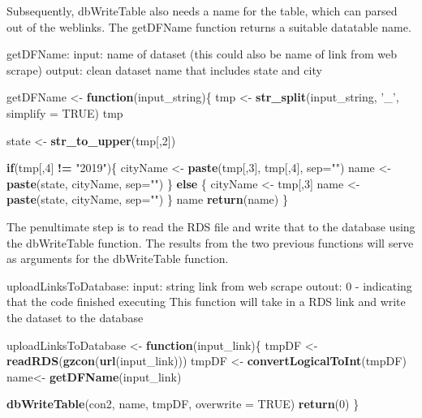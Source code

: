 \documentclass[
]{book}
\newenvironment{Shaded}{\begin{snugshade}}{\end{snugshade}}
\newcommand{\ControlFlowTok}[1]{\textcolor[rgb]{0.13,0.29,0.53}{\textbf{#1}}}
\newcommand{\DataTypeTok}[1]{\textcolor[rgb]{0.13,0.29,0.53}{#1}}
\newcommand{\DecValTok}[1]{\textcolor[rgb]{0.00,0.00,0.81}{#1}}
\newcommand{\KeywordTok}[1]{\textcolor[rgb]{0.13,0.29,0.53}{\textbf{#1}}}
\newcommand{\NormalTok}[1]{#1}
\newcommand{\OperatorTok}[1]{\textcolor[rgb]{0.81,0.36,0.00}{\textbf{#1}}}
\newcommand{\OtherTok}[1]{\textcolor[rgb]{0.56,0.35,0.01}{#1}}
\newcommand{\StringTok}[1]{\textcolor[rgb]{0.31,0.60,0.02}{#1}}
\begin{document}
Subsequently, dbWriteTable also needs a name for the table, which can parsed out of the weblinks. The getDFName function returns a suitable datatable name.

getDFName:
input: name of dataset (this could also be name of link from web scrape)
output: clean dataset name that includes state and city

\begin{Shaded}
\begin{Highlighting}[]
\NormalTok{getDFName <-}\StringTok{ }\ControlFlowTok{function}\NormalTok{(input_string)\{}
\NormalTok{  tmp <-}\StringTok{ }\KeywordTok{str_split}\NormalTok{(input_string, }\StringTok{'_'}\NormalTok{, }\DataTypeTok{simplify =} \OtherTok{TRUE}\NormalTok{)}
\NormalTok{tmp}

\NormalTok{state <-}\StringTok{ }\KeywordTok{str_to_upper}\NormalTok{(tmp[,}\DecValTok{2}\NormalTok{])}

\ControlFlowTok{if}\NormalTok{(tmp[,}\DecValTok{4}\NormalTok{] }\OperatorTok{!=}\StringTok{ "2019"}\NormalTok{)\{}
\NormalTok{    cityName <-}\StringTok{ }\KeywordTok{paste}\NormalTok{(tmp[,}\DecValTok{3}\NormalTok{], tmp[,}\DecValTok{4}\NormalTok{], }\DataTypeTok{sep=}\StringTok{""}\NormalTok{)}
\NormalTok{    name <-}\StringTok{ }\KeywordTok{paste}\NormalTok{(state, cityName, }\DataTypeTok{sep=}\StringTok{""}\NormalTok{)}
\NormalTok{\} }\ControlFlowTok{else}\NormalTok{ \{}
\NormalTok{    cityName <-}\StringTok{ }\NormalTok{tmp[,}\DecValTok{3}\NormalTok{]}
\NormalTok{    name <-}\StringTok{ }\KeywordTok{paste}\NormalTok{(state, cityName, }\DataTypeTok{sep=}\StringTok{""}\NormalTok{)}
\NormalTok{\}}
\NormalTok{name}
\KeywordTok{return}\NormalTok{(name)}
\NormalTok{\}}
\end{Highlighting}
\end{Shaded}

The penultimate step is to read the RDS file and write that to the database using the dbWriteTable function. The results from the two previous functions will serve as arguments for the dbWriteTable function.

uploadLinksToDatabase:
input: string link from web scrape
outout: 0 - indicating that the code finished executing
This function will take in a RDS link and write the dataset to the database

\begin{Shaded}
\begin{Highlighting}[]
\NormalTok{uploadLinksToDatabase <-}\StringTok{ }\ControlFlowTok{function}\NormalTok{(input_link)\{}
\NormalTok{  tmpDF <-}\StringTok{ }\KeywordTok{readRDS}\NormalTok{(}\KeywordTok{gzcon}\NormalTok{(}\KeywordTok{url}\NormalTok{(input_link)))}
\NormalTok{  tmpDF <-}\StringTok{ }\KeywordTok{convertLogicalToInt}\NormalTok{(tmpDF)}
\NormalTok{  name<-}\StringTok{ }\KeywordTok{getDFName}\NormalTok{(input_link)}
  
  \KeywordTok{dbWriteTable}\NormalTok{(con2, name, tmpDF, }\DataTypeTok{overwrite =} \OtherTok{TRUE}\NormalTok{)}
  \KeywordTok{return}\NormalTok{(}\DecValTok{0}\NormalTok{)}
\NormalTok{\}}
\end{Highlighting}
\end{Shaded}
\end{document}
